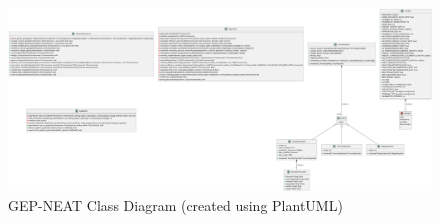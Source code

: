 \newpage
\thispagestyle{empty}
\begin{landscape}
\begin{figure}[H] %
	\centering %
	\includegraphics[width=\linewidth]{PlantUml/class_diagram.png} %
	\caption{GEP-NEAT Class Diagram (created using PlantUML)}
	\label{fig:proto_class_diagram} %
\end{figure}
\end{landscape}

